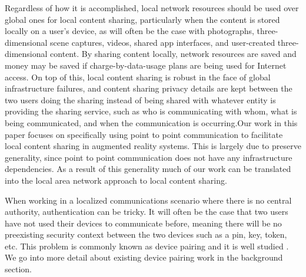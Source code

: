 \documentclass[12pt]{report}
\begin{document}
Regardless of how it is accomplished, local network resources should be used over global ones for local content sharing, particularly when the content is stored locally on a user's device, as will often be the case with photographs, three-dimensional scene captures, videos, shared app interfaces, and user-created three-dimensional content. By sharing content locally, network resources are saved and money may be saved if charge-by-data-usage plans are being used for Internet access. On top of this, local content sharing is robust in the face of global infrastructure failures, and content sharing privacy details are kept between the two users doing the sharing instead of being shared with whatever entity is providing the sharing service, such as who is communicating with whom, what is being communicated, and when the communication is occurring.Our work in this paper focuses on specifically using point to point communication to facilitate local content sharing in augmented reality systems. This is largely due to preserve generality, since point to point communication does not have any infrastructure dependencies. As a result of this generality much of our work can be translated into the local area network approach to local content sharing. \par

When working in a localized communications scenario where there is no central authority, authentication can be tricky. It will often be the case that two users have not used their devices to communicate before, meaning there will be no preexisting security context between the two devices such as a pin, key, token, etc. This problem is commonly known as device pairing and it is well studied \cite{ConferenceCompStudySecurePairingKumar2009,VisualChannelPairingSaxena2006,InBandPairingGollaktoa2011,DucklingStajano2000,PlayfulPairingGallego2011,SASVaudenay2005,ManaGehrmann2004,ShakeWellBeforeUseMayrhofer2009,SeeingIsBelievingMcCune2005,TalkingToStrangersSmetters2002,LoudAndClearGoodrich2006,HapadepSoriente2008}. We go into more detail about existing device pairing work in the background section. \par 
\end{document}
